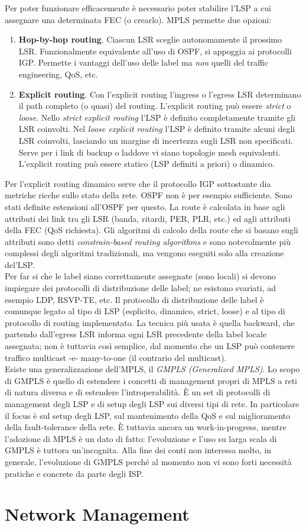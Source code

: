 Per poter funzionare efficacemente è necessario poter stabilire l'LSP a cui assegnare una determinata FEC (o crearlo). MPLS permette due opzioni:
\begin{enumerate}
	\item \textbf{Hop-by-hop routing}. Ciascun LSR sceglie autonomamente il prossimo LSR. Funzionalmente equivalente all'uso di OSPF, si appoggia ai protocolli IGP. Permette i vantaggi dell'uso delle label ma \textit{non} quelli del traffic engineering, QoS, etc.
	\item \textbf{Explicit routing}. Con l'explicit routing l'ingress o l'egress LSR determinano il path completo (o quasi) del routing. L'explicit routing può essere \textit{strict} o \textit{loose}. Nello \textit{strict explicit routing} l'LSP è definito completamente tramite gli LSR coinvolti. Nel \textit{loose explicit routing} l'LSP è definito tramite alcuni degli LSR coinvolti, lasciando un margine di incertezza sugli LSR non specificati. Serve per i link di backup o laddove vi siano topologie mesh equivalenti. L'explicit routing può essere statico (LSP definiti a priori) o dinamico.
\end{enumerate}
Per l'explicit routing dinamico serve che il protocollo IGP sottostante dia metriche ricche sullo stato della rete. OSPF non è per esempio sufficiente. Sono stati definite estensioni all'OSPF per questo. La route è calcolata in base agli attributi dei link tra gli LSR (banda, ritardi, PER, PLR, etc.) ed agli attributi della FEC (QoS richiesta). Gli algoritmi di calcolo della route che si basano sugli attributi sono detti \textit{constrain-based routing algorithms} e sono notevolmente più complessi degli algoritmi tradizionali, ma vengono eseguiti solo alla creazione del'LSP.\\
Per far si che le label siano correttamente assegnate (sono locali) si devono impiegare dei protocolli di distribuzione delle label; ne esistono svariati, ad esempio LDP, RSVP-TE, etc. Il protocollo di distribuzione delle label è comunque legato al tipo di LSP (esplicito, dinamico, strict, loose) e al tipo di protocollo di routing implementato. La tecnica più usata è quella backward, che partendo dall'egress LSR informa ogni LSR precedente della label locale assegnata; non è tuttavia così semplice, dal momento che un LSP può contenere traffico multicast -e- many-to-one (il contrario del multicast).\\
Esiste una generalizzazione dell'MPLS, il \textit{GMPLS (Generalized MPLS)}. Lo scopo di GMPLS è quello di estendere i concetti di management propri di MPLS a reti di natura diversa e di estendere l'introperabilità. È un set di protocolli di management degli LSP e di setup degli LSP sui diversi tipi di rete. In particolare il focus è sul setup degli LSP, sul mantenimento della QoS e sul miglioramento della fault-tolerance della rete. È tuttavia ancora un work-in-progress, mentre l'adozione di MPLS è un dato di fatto: l'evoluzione e l'uso su larga scala di GMPLS è tuttora un'incognita. Alla fine dei conti non interessa molto, in generale, l'evoluzione di GMPLS perché al momento non vi sono forti necessità pratiche e concrete da parte degli ISP.

\section{Network Management}
